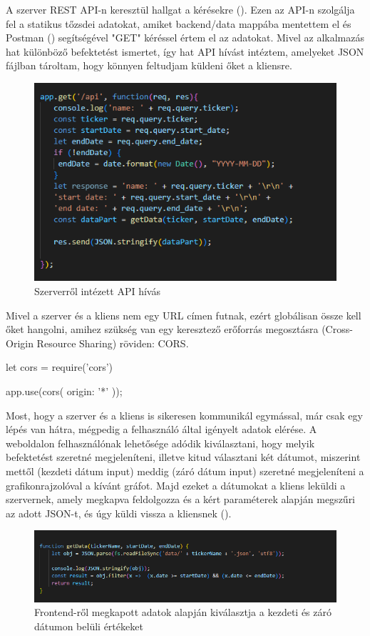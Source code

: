 A szerver REST API-n keresztül hallgat a kérésekre (). Ezen az API-n szolgálja fel a statikus tőzsdei adatokat, amiket backend/data mappába mentettem el és Postman  () segítségével "GET" kéréssel értem el az adatokat. Mivel az alkalmazás hat különböző befektetést ismertet, így hat API hívást intéztem, amelyeket JSON fájlban tároltam, hogy könnyen feltudjam küldeni őket a kliensre.

\begin{figure}[h]
\centering
\includegraphics[scale=0.8]{images/apiCall.png}
\caption{Szerverről intézett API hívás}
\label{fig:apiCall}
\end{figure}

Mivel a szerver és a kliens nem egy URL címen futnak, ezért globálisan össze kell őket hangolni, amihez szükség van egy keresztező erőforrás megosztásra (Cross-Origin Resource Sharing) röviden: CORS. 

\begin{cpp}
let cors = require('cors')

app.use(cors({
   origin: '*'
}));
\end{cpp} 

\pagebreak

Most, hogy a szerver és a kliens is sikeresen kommunikál egymással, már csak egy lépés van hátra, mégpedig a felhasználó által igényelt adatok elérése. A weboldalon felhasználónak lehetősége adódik kiválasztani, hogy melyik befektetést szeretné megjeleníteni, illetve kitud választani két dátumot, miszerint mettől (kezdeti dátum input) meddig (záró dátum input) szeretné megjeleníteni a grafikonrajzolóval a kívánt gráfot. Majd ezeket a dátumokat a kliens leküldi a szervernek, amely megkapva feldolgozza és a kért paraméterek alapján megszűri az adott JSON-t, és úgy küldi vissza a kliensnek ().

\begin{figure}[h]
\centering
\includegraphics[scale=0.7]{images/getData.png}
\caption{Frontend-ről megkapott adatok alapján kiválasztja a kezdeti és záró dátumon belüli értékeket}
\label{fig:getData}
\end{figure}